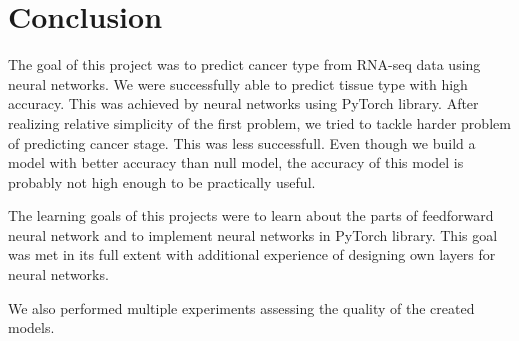 \chapter*{Conclusion}  %

The goal of this project was to predict cancer type from RNA-seq data using neural networks.
We were successfully able to predict tissue type with high accuracy.
This was achieved by neural networks using PyTorch library.
After realizing relative simplicity of the first problem, we tried to tackle harder problem of predicting cancer stage. 
This was less successfull. 
Even though we build a model with better accuracy than null model, the accuracy of this model is probably not high enough to be practically useful.

The learning goals of this projects were to learn about the parts of feedforward neural network and to implement neural networks in PyTorch library.
This goal was met in its full extent with additional experience of designing own layers for neural networks.

We also performed multiple experiments assessing the quality of the created models.


